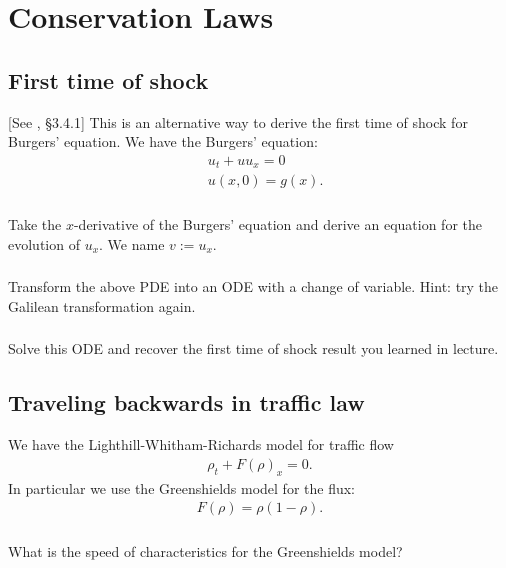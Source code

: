 \documentclass[11pt,letterpaper]{report}
\begin{document}
\chapter{Conservation Laws}
\section{First time of shock}
[See \cite{ShearerLevy_15}, \S 3.4.1] This is an alternative way to derive the first time of shock for Burgers' equation. We have the Burgers' equation:
\begin{align}
    & u_t + uu_x = 0\label{eq:burgers}\\
    & u(x,0) = g(x).\nonumber
\end{align}

\subsection{}
Take the $x$-derivative of the Burgers' equation and derive an equation for the evolution of $u_x$. We name $v:= u_x$.

\subsection{}
Transform the above PDE into an ODE with a change of variable. Hint: try the Galilean transformation again.

\subsection{}
Solve this ODE and recover the first time of shock result you learned in lecture.

\section{Traveling backwards in traffic law}
We have the Lighthill-Whitham-Richards model for traffic flow
\begin{align}
    \rho_t + F(\rho)_x = 0.
\end{align}
In particular we use the Greenshields model for the flux:
\begin{align}
    F(\rho) = \rho(1-\rho).
\end{align}

\subsection{}
What is the speed of characteristics for the Greenshields model?
\end{document}
